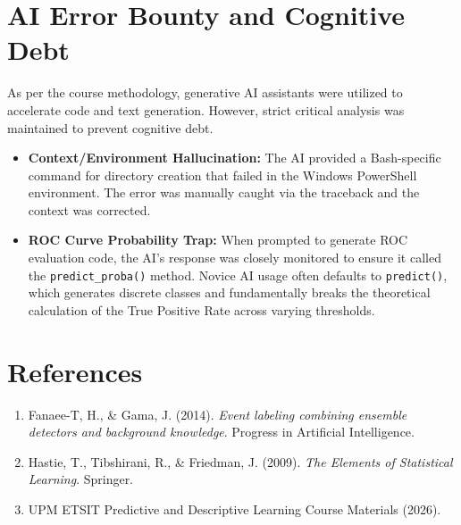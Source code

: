 \documentclass[12pt,a4paper]{article}
\begin{document}
\section{AI Error Bounty and Cognitive Debt}
As per the course methodology, generative AI assistants were utilized to accelerate code and text generation. However, strict critical analysis was maintained to prevent cognitive debt.
\begin{itemize}
    \item \textbf{Context/Environment Hallucination:} The AI provided a Bash-specific command for directory creation that failed in the Windows PowerShell environment. The error was manually caught via the traceback and the context was corrected.
    \item \textbf{ROC Curve Probability Trap:} When prompted to generate ROC evaluation code, the AI's response was closely monitored to ensure it called the \texttt{predict\_proba()} method. Novice AI usage often defaults to \texttt{predict()}, which generates discrete classes and fundamentally breaks the theoretical calculation of the True Positive Rate across varying thresholds.
\end{itemize}

\section{References}
\begin{enumerate}
    \item Fanaee-T, H., \& Gama, J. (2014). \textit{Event labeling combining ensemble detectors and background knowledge}. Progress in Artificial Intelligence.
    \item Hastie, T., Tibshirani, R., \& Friedman, J. (2009). \textit{The Elements of Statistical Learning}. Springer.
    \item UPM ETSIT Predictive and Descriptive Learning Course Materials (2026).
\end{enumerate}
\end{document}
